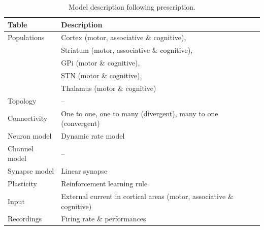 \begin{table}[htbp]
  \small \centering
  \begin{tabular}{ll}
\bf Table & \bf Description\\
\hline 
Populations & Cortex (motor, associative \& cognitive),\\
            & Striatum (motor, associative \& cognitive),\\
            & GPi (motor \& cognitive),\\
            & STN (motor \& cognitive),\\
            & Thalamus (motor \& cognitive)\\
Topology & --\\
Connectivity & One to one, one to many (divergent), many to one (convergent)\\
Neuron model & Dynamic rate model\\
Channel model & --\\
Synapse model & Linear synapse\\
Plasticity & Reinforcement learning rule\\
Input & External current in cortical areas (motor, associative \& cognitive)\\
Recordings & Firing rate \& performances\\
\hline
  \end{tabular}
\caption{Model description following \cite{Nordlie:2009} prescription.}
\end{table}


